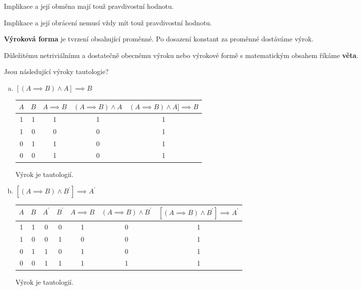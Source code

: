\begin{veta}
  Implikace a její obměna mají touž pravdivostní hodnotu.
\end{veta}

\begin{pozn}
  Implikace a její obrácení nemusí vždy mít touž pravdivostní hodnotu.
\end{pozn}

\begin{definition}
  \textbf{Výroková forma} je tvrzení obsahující proměnné. Po dosazení konstant za proměnné dostáváme výrok.
\end{definition}

\begin{pozn}
  Důležitému netriviálnímu a dostatečně obecnému výroku nebo výrokové formě s matematickým obsahem říkáme \textbf{věta}.
\end{pozn}

\begin{example}[SMP 143/4]
  Jsou následující výroky tautologie?
  \rm
  \begin{enumerate}[a.]
    \item $\left[(A\implies B)\land A\right]\implies B$
    \begin{center}
      \begin{tabular}{c c | c c c}
        $A$ & $B$ & $A \implies B$ & $(A\implies B)\land A$ & $(A\implies B)\land A]\implies B$ \\
        \hline
        1 & 1 & 1 & 1 & 1 \\
        1 & 0 & 0 & 0 & 1 \\
        0 & 1 & 1 & 0 & 1 \\
        0 & 0 & 1 & 0 & 1
      \end{tabular}
    \end{center}
    Výrok je tautologií.
    \item $\left[(A\implies B)\land B^\prime\right]\implies A^\prime$
    \begin{center}
      \begin{tabular}{c c c c | c c c}
        $A$ & $B$ & $A^\prime$ & $B^\prime$ &  $A \implies B$ & $(A\implies B)\land B^\prime$ & $\left[(A\implies B)\land B^\prime\right]\implies A^\prime$ \\
        \hline
        1 & 1 & 0 & 0 & 1 & 0 & 1 \\
        1 & 0 & 0 & 1 & 0 & 0 & 1 \\
        0 & 1 & 1 & 0 & 1 & 0 & 1 \\
        0 & 0 & 1 & 1 & 1 & 1 & 1
      \end{tabular}
    \end{center}
    Výrok je tautologií.
  \end{enumerate}
\end{example}

